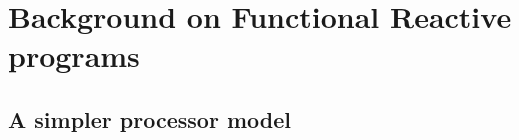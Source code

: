 
\section{Background on Functional Reactive programs}\label{background}



\clearpage

\subsection{A simpler processor model}\label{processor-model}



